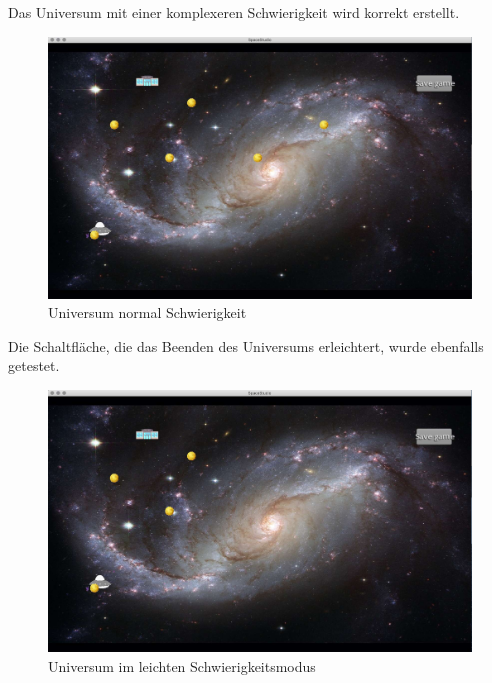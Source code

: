 \documentclass[12pt]{article}
\begin{document}
\newpage
Das Universum mit einer komplexeren Schwierigkeit wird korrekt erstellt.\\

\begin{figure}[t]
\centering
\includegraphics[scale=0.4]{TestProtocolBilder/universeHard.jpg}
\caption{Universum normal Schwierigkeit}
\end{figure}

Die Schaltfläche, die das Beenden des Universums erleichtert, wurde ebenfalls getestet.\\

\begin{figure}[t]
\centering
\includegraphics[scale=0.4]{TestProtocolBilder/universeEase.jpg}
\caption{Universum im leichten Schwierigkeitsmodus}
\end{figure}

\newpage
\end{document}
